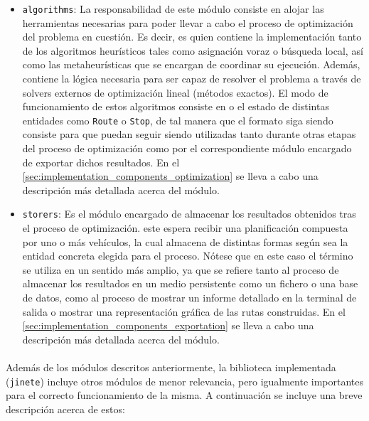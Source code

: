\documentclass{subfiles}
\begin{document}
\begin{itemize}
              \item \texttt{algorithms}: La responsabilidad de este módulo consiste en alojar las herramientas necesarias para poder llevar a cabo el proceso de optimización del problema en cuestión. Es decir, es quien contiene la implementación tanto de los algoritmos heurísticos tales como asignación voraz o búsqueda local, así como las metaheurísticas que se encargan de coordinar su ejecución. Además, contiene la lógica necesaria para ser capaz de resolver el problema a través de solvers externos de optimización lineal (métodos exactos). El modo de funcionamiento de estos algoritmos consiste en  o  el estado de distintas entidades como \texttt{Route} o \texttt{Stop}, de tal manera que el formato siga siendo consiste para que puedan seguir siendo utilizadas tanto durante otras etapas del proceso de optimización como por el correspondiente módulo encargado de exportar dichos resultados. En el \cref{sec:implementation_components_optimization} se lleva a cabo una descripción más detallada acerca del módulo.

              \item \texttt{storers}: Es el módulo encargado de almacenar los resultados obtenidos tras el proceso de optimización. este espera recibir una planificación compuesta por uno o más vehículos, la cual almacena de distintas formas según sea la entidad concreta elegida para el proceso. Nótese que en este caso el término  se utiliza en un sentido más amplio, ya que se refiere tanto al proceso de almacenar los resultados en un medio persistente como un fichero o una base de datos, como al proceso de mostrar un informe detallado en la terminal de salida o mostrar una representación gráfica de las rutas construidas. En el \cref{sec:implementation_components_exportation} se lleva a cabo una descripción más detallada acerca del módulo.


          \end{itemize}

          \paragraph{}
          Además de los módulos descritos anteriormente, la biblioteca implementada (\texttt{jinete}) incluye otros módulos de menor relevancia, pero igualmente importantes para el correcto funcionamiento de la misma. A continuación se incluye una breve descripción acerca de estos:
\end{document}
